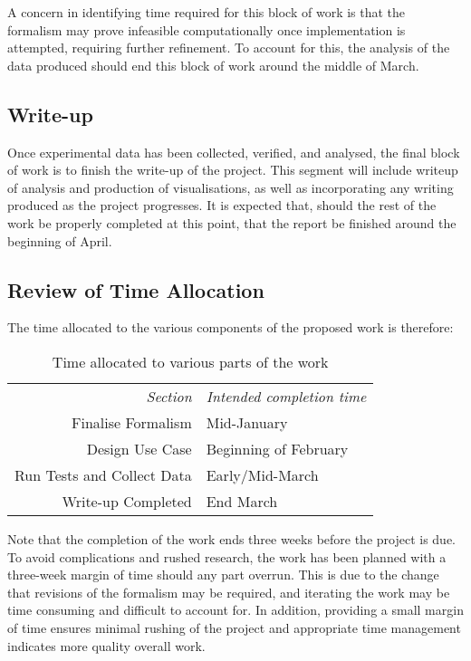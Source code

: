 A concern in identifying time required for this block of work is that the formalism may prove infeasible computationally once implementation is attempted, requiring further refinement. To account for this, the analysis of the data produced should end this block of work around the middle of March.\par

\subsection{Write-up}
Once experimental data has been collected, verified, and analysed, the final block of work is to finish the write-up of the project. This segment will include writeup of analysis and production of visualisations, as well as incorporating any writing produced as the project progresses. It is expected that, should the rest of the work be properly completed at this point, that the report be finished around the beginning of April.\par

\subsection{Review of Time Allocation}
The time allocated to the various components of the proposed work is therefore:%

\begin{table}[H]\label{table:time-allocation}
\begin{center}
\begin{tabular}{r|l}
    \emph{Section} & \emph{Intended completion time}\\
    Finalise Formalism & Mid-January\\
    Design Use Case & Beginning of February\\
    Run Tests and Collect Data & Early/Mid-March\\
    Write-up Completed & End March\\
\end{tabular}\par
    \caption{Time allocated to various parts of the work}
\end{center}
\end{table}

Note that the completion of the work ends three weeks before the project is due. To avoid complications and rushed research, the work has been planned with a three-week margin of time should any part overrun. This is due to the change that revisions of the formalism may be required, and iterating the work may be time consuming and difficult to account for. In addition, providing a small margin of time ensures minimal rushing of the project and appropriate time management indicates more quality overall work.\par
